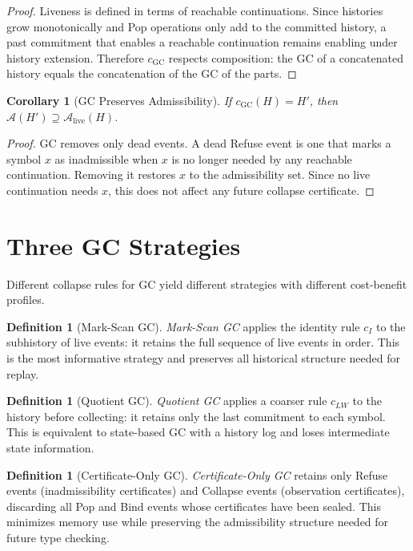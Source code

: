 \documentclass[12pt, a4paper, openany]{book}
\theoremstyle{plain}
\newtheorem{corollary}[theorem]{Corollary}
\theoremstyle{definition}
\newtheorem{definition}[theorem]{Definition}
\theoremstyle{remark}
\newcommand{\calA}{\mathcal{A}}
\begin{document}
\begin{proof}
Liveness is defined in terms of reachable continuations. Since histories grow
monotonically and Pop operations only add to the committed history, a past
commitment that enables a reachable continuation remains enabling under history
extension. Therefore $c_{\mathrm{GC}}$ respects composition: the GC of a
concatenated history equals the concatenation of the GC of the parts.
\end{proof}

\begin{corollary}[GC Preserves Admissibility]
If $c_{\mathrm{GC}}(H) = H'$, then $\calA(H') \supseteq \calA_{\mathrm{live}}(H)$.
\end{corollary}

\begin{proof}
GC removes only dead events. A dead Refuse event is one that marks a symbol
$x$ as inadmissible when $x$ is no longer needed by any reachable continuation.
Removing it restores $x$ to the admissibility set. Since no live continuation
needs $x$, this does not affect any future collapse certificate.
\end{proof}

\section{Three GC Strategies}

Different collapse rules for GC yield different strategies with different
cost-benefit profiles.

\begin{definition}[Mark-Scan GC]
\emph{Mark-Scan GC} applies the identity rule $c_I$ to the subhistory of live
events: it retains the full sequence of live events in order. This is the most
informative strategy and preserves all historical structure needed for replay.
\end{definition}

\begin{definition}[Quotient GC]
\emph{Quotient GC} applies a coarser rule $c_{LW}$ to the history before
collecting: it retains only the last commitment to each symbol. This is equivalent
to state-based GC with a history log and loses intermediate state information.
\end{definition}

\begin{definition}[Certificate-Only GC]
\emph{Certificate-Only GC} retains only Refuse events (inadmissibility
certificates) and Collapse events (observation certificates), discarding all Pop
and Bind events whose certificates have been sealed. This minimizes memory use
while preserving the admissibility structure needed for future type checking.
\end{definition}
\end{document}
